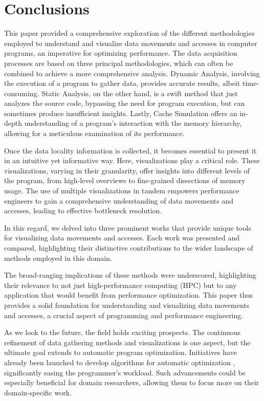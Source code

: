 \section{Conclusions}
This paper provided a comprehensive exploration of the different methodologies employed to understand and visualize data movements and accesses in computer programs, an imperative for optimizing performance. The data acquisition processes are based on three principal methodologies, which can often be combined to achieve a more comprehensive analysis. Dynamic Analysis, involving the execution of a program to gather data, provides accurate results, albeit time-consuming. Static Analysis, on the other hand, is a swift method that just analyzes the source code, bypassing the need for program execution, but can sometimes produce insufficient insights. Lastly, Cache Simulation offers an in-depth understanding of a program's interaction with the memory hierarchy, allowing for a meticulous examination of its performance.

Once the data locality information is collected, it becomes essential to present it in an intuitive yet informative way. Here, visualizations play a critical role. These visualizations, varying in their granularity, offer insights into different levels of the program, from high-level overviews to fine-grained dissections of memory usage. The use of multiple visualizations in tandem empowers performance engineers to gain a comprehensive understanding of data movements and accesses, leading to effective bottleneck resolution.

In this regard, we delved into three prominent works that provide unique tools for visualizing data movements and accesses. Each work was presented and compared, highlighting their distinctive contributions to the wider landscape of methods employed in this domain.

The broad-ranging implications of these methods were underscored, highlighting their relevance to not just high-performance computing (HPC) but to any application that would benefit from performance optimization. This paper thus provides a solid foundation for understanding and visualizing data movements and accesses, a crucial aspect of programming and performance engineering.

As we look to the future, the field holds exciting prospects. The continuous refinement of data gathering methods and visualizations is one aspect, but the ultimate goal extends to automatic program optimization. Initiatives have already been launched to develop algorithms for automatic optimization \cite{calotoiu2022lifting}, significantly easing the programmer's workload. Such advancements could be especially beneficial for domain researchers, allowing them to focus more on their domain-specific work.

